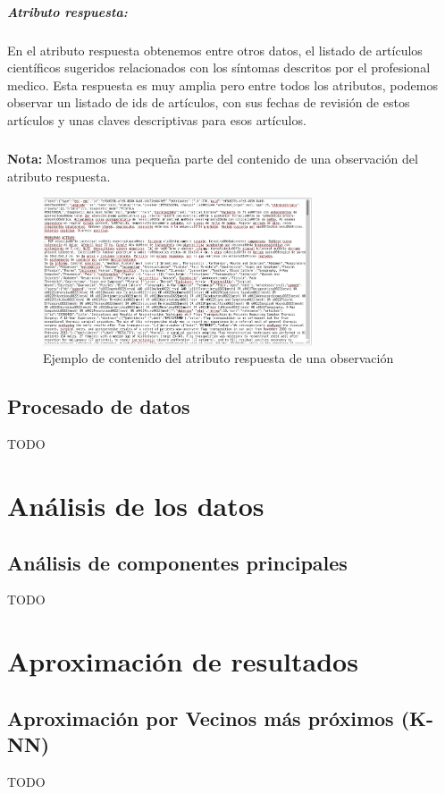 \documentclass[10pt,a4paper]{book}
\begin{document}
\paragraph{\textbf{Atributo respuesta}: } En el atributo respuesta obtenemos entre otros datos, el listado de artículos científicos sugeridos relacionados con los síntomas descritos por el profesional medico. Esta respuesta es muy amplia pero entre todos los atributos, podemos observar un listado de ids de artículos, con sus fechas de revisión de estos artículos y unas claves descriptivas para esos artículos.

\paragraph{}
\textbf{Nota:} Mostramos una pequeña parte del contenido de una observación del atributo respuesta.
\begin{figure}[h]
  \centering
  \includegraphics[width=8cm]{images/extraccion_1_2.png}
  \caption{Ejemplo de contenido del atributo respuesta de una observación}
\end{figure}


\section{Procesado de datos}
TODO

\chapter{Análisis de los datos}

\section{Análisis de componentes principales}
TODO

\chapter{Aproximación de resultados}

\section{Aproximación por Vecinos más próximos (K-NN)}
TODO
\end{document}
